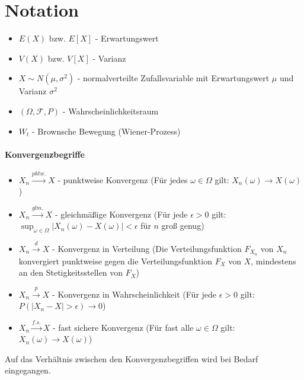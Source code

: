 \section{Notation}
\begin{itemize}
    \item $E(X)$ bzw. $E[X]$ - Erwartungswert
    \item $V(X)$ bzw. $V[X]$ - Varianz
    \item $X \sim N(\mu, \sigma^2)$ - normalverteilte Zufallsvariable mit Erwartungswert $\mu$ und Varianz $\sigma^2$
    \item $(\Omega, \mathcal F, P)$ - Wahrscheinlichkeitsraum
    \item $W_t$ - Brownsche Bewegung (Wiener-Prozess)
\end{itemize}

\paragraph{Konvergenzbegriffe}

\begin{itemize}
    \item $X_n \xrightarrow{pktw.} X$ - punktweise Konvergenz (Für jedes $\omega \in \Omega$ gilt: $X_n(\omega) \to X(\omega)$)
    \item $X_n \xrightarrow{glm.} X$ - gleichmäßige Konvergenz (Für jede $\epsilon > 0$ gilt: $\sup_{\omega \in \Omega} |X_n(\omega) - X(\omega)| < \epsilon$ für $n$ groß genug)
    \item $X_n \xrightarrow{d} X$ - Konvergenz in Verteilung (Die Verteilungsfunktion $F_{X_n}$ von $X_n$ konvergiert punktweise gegen die Verteilungsfunktion $F_X$ von $X$, mindestens an den Stetigkeitsstellen von $F_X$)
    \item $X_n \xrightarrow{p} X$ - Konvergenz in Wahrscheinlichkeit (Für jede $\epsilon > 0$ gilt: $P(|X_n - X| > \epsilon) \to 0$)
    \item $X_n \xrightarrow{f.s.} X$ - fast sichere Konvergenz (Für fast alle $\omega \in \Omega$ gilt: $X_n(\omega) \to X(\omega)$)
\end{itemize}

Auf das Verhältnis zwischen den Konvergenzbegriffen wird bei Bedarf eingegangen.